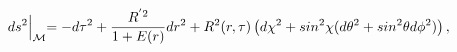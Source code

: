 \begin{equation}
\label{metric} ds^2\Bigl|_{{\cal M}}=-d\tau^2+
\frac{R^{'2}}{1+E(r)}dr^2+R^2(r,\tau) \left(d\chi^2+sin^2\chi
(d\theta^2+ sin^2\theta d\phi^2)\right),
\end{equation}

